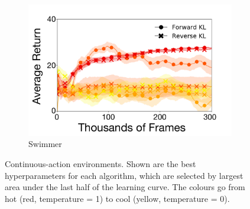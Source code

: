 \documentclass{article}
\begin{document}
\begin{figure}[t]
\begin{subfigure}[b]{0.33\linewidth}
    \centering
    \includegraphics[width=\columnwidth]{figs/deep/continuous/Swimmer_entropy_comparison.pdf} 
    \caption{Swimmer}\label{fig:swimmer}
  \end{subfigure}
  \caption{Continuous-action environments. Shown are the best hyperparameters for each algorithm, which are selected by largest area under the last half of the learning curve. The colours go from hot (red, temperature = 1) to cool (yellow, temperature = 0). }\label{fig_cont}
\end{figure}
\end{document}
